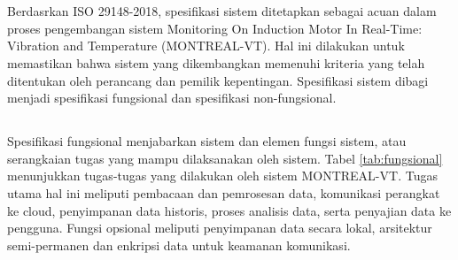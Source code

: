 \documentclass{elsinta}
\begin{document}
\newpage

\section{\SystemSpecTitle}
Berdasrkan ISO 29148-2018\cite{3.1.1}, spesifikasi sistem ditetapkan sebagai acuan 
dalam proses pengembangan sistem Monitoring On Induction Motor In Real-Time:
Vibration and Temperature (MONTREAL-VT). Hal ini dilakukan 
untuk memastikan bahwa sistem yang dikembangkan memenuhi kriteria yang telah ditentukan
oleh perancang dan pemilik kepentingan. Spesifikasi sistem dibagi menjadi spesifikasi 
fungsional dan spesifikasi non-fungsional.

\subsection{\FunctionalSpecTitle}
Spesifikasi fungsional menjabarkan sistem dan elemen fungsi sistem, atau serangkaian tugas
yang mampu dilaksanakan oleh sistem\cite{3.1.1}. Tabel \ref{tab:fungsional} menunjukkan
tugas-tugas yang dilakukan oleh sistem MONTREAL-VT. Tugas utama hal ini meliputi pembacaan
dan pemrosesan data, komunikasi perangkat ke cloud, penyimpanan data historis, 
proses analisis data, serta penyajian data ke pengguna. Fungsi opsional meliputi penyimpanan
data secara lokal, arsitektur semi-permanen dan enkripsi data untuk keamanan komunikasi.
\end{document}

